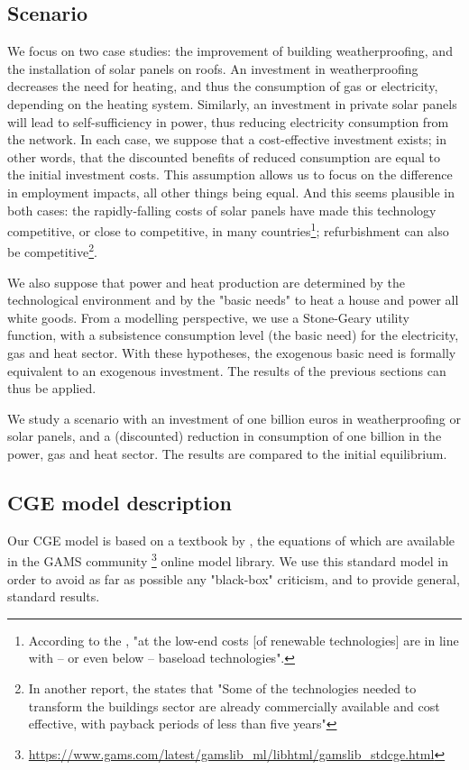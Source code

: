 \subsection{Scenario}
We focus on two case studies: the improvement of building weatherproofing, and the installation of solar panels on roofs. 
An investment in weatherproofing decreases the need for heating, and thus the consumption of gas or electricity, depending on the heating system. Similarly, an investment in private solar panels will lead to self-sufficiency in power, thus reducing electricity consumption from the network. 
In each case, we suppose that a cost-effective investment exists; in other words, that the discounted benefits of reduced consumption are equal to the initial investment costs. This assumption allows us to focus on the difference in employment impacts, all other things being equal. And this seems plausible in both cases: the rapidly-falling costs of solar panels have made this technology competitive, or close to competitive, in many countries\footnote{According to the \citet{IEA2015}, "at the low-end costs [of renewable technologies] are in line with – or even below – baseload technologies".}; refurbishment can also be competitive\footnote{In another report, the \citet{InternationalEnergyAgency2013} states that "Some of the technologies needed to transform the buildings sector are already commercially available and cost effective, with payback periods of less than five years"}.

We also suppose that power and heat production are determined by the technological environment and by the "basic needs" to heat a house and power all white goods. From a modelling perspective, we use a Stone-Geary utility function, with a subsistence consumption level (the basic need) for the electricity, gas and heat sector.
With these hypotheses, the exogenous basic need is formally equivalent to an exogenous investment. The results of the previous sections can thus be applied.

We study a scenario with an investment of one billion euros in weatherproofing or solar panels, and a (discounted) reduction in consumption of one billion in the power, gas and heat sector.
The results are compared to the initial equilibrium. 


\subsection{CGE model description}
Our CGE model is based on a textbook by \citet{Hosoe2010}, the equations of which are available in the GAMS community \footnote{\url{https://www.gams.com/latest/gamslib\_ml/libhtml/gamslib\_stdcge.html}} online model library. 
We use this standard model in order to avoid as far as possible any "black-box" criticism, and to provide general, standard results.


